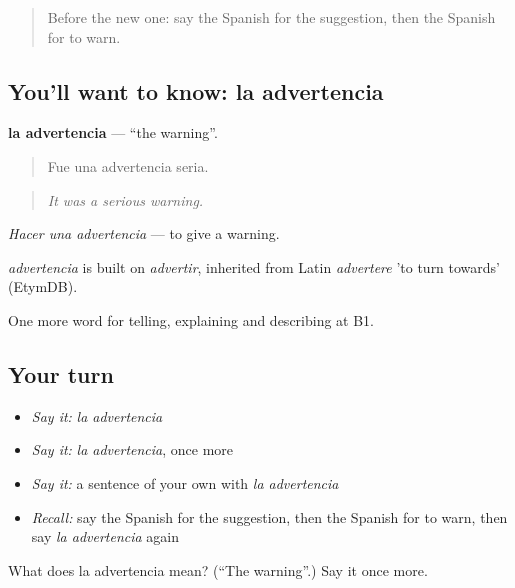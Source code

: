 \label{lesson:ES-C585-advertencia}



\begin{quote}
Before the new one: say the Spanish for the suggestion, then the Spanish for to warn.
\end{quote}

\subsection*{You'll want to know: la advertencia}
\textbf{la advertencia} — \textquotedblleft{}the warning\textquotedblright{}.

\begin{quote}
Fue una advertencia seria.
\end{quote}

\begin{quote}
\emph{It was a serious warning.}
\end{quote}

\emph{Hacer una advertencia} — to give a warning.

\begin{cousinweb}
\emph{advertencia} is built on \emph{advertir}, inherited from Latin \emph{advertere} 'to turn towards' (EtymDB).
\end{cousinweb}

\begin{grammarlens}[title={What you've built}]
One more word for telling, explaining and describing at B1.
\end{grammarlens}

\subsection*{Your turn}
\begin{itemize}
\raggedright
  \item \emph{Say it:} \emph{la advertencia}
  \item \emph{Say it:} \emph{la advertencia}, once more
  \item \emph{Say it:} a sentence of your own with \emph{la advertencia}
  \item \emph{Recall:} say the Spanish for the suggestion, then the Spanish for to warn, then say \emph{la advertencia} again
\end{itemize}

\begin{tcolorbox}[breakable,colback=teal!4,colframe=teal!35!black,title={Before you move on}]
What does la advertencia mean? (\textquotedblleft{}The warning\textquotedblright{}.) Say it once more.
\end{tcolorbox}
